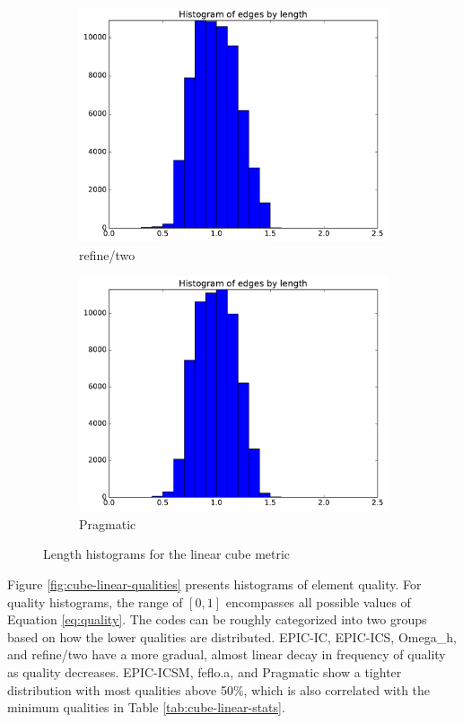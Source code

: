 \documentclass[3p,times,procedia,number]{elsarticle}
\begin{document}
\begin{figure}
\begin{subfigure}{.24\textwidth}
\includegraphics[width=\textwidth]{refine-two-cube-linear-length.pdf}
\caption{refine/two}
\end{subfigure}
\begin{subfigure}{.24\textwidth}
\centering
\includegraphics[width=\textwidth]{pragmatic-cube-linear-length.pdf}
\caption{Pragmatic}
\end{subfigure}
\caption{Length histograms for the linear cube metric}
\label{fig:cube-linear-lengths}
\end{figure}

Figure \ref{fig:cube-linear-qualities} presents histograms of element
quality.
For quality histograms, the range of $[0,1]$ encompasses all possible
values of Equation \ref{eq:quality}.
The codes can be roughly categorized into two groups based on
how the lower qualities are distributed.
EPIC-IC, EPIC-ICS, Omega\_h, and refine/two have a more gradual,
almost linear decay in frequency of quality as quality decreases.
EPIC-ICSM, feflo.a, and Pragmatic show a tighter distribution
with most qualities above 50\%, which is also correlated
with the minimum qualities in Table \ref{tab:cube-linear-stats}.
\end{document}
